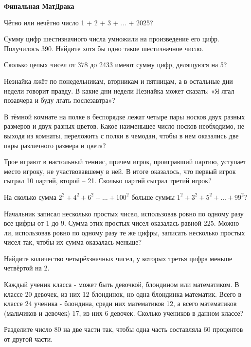 \centerline{\bf \Huge Финальная МатДрака }

 Чётно или нечётно число  1 + 2 + 3 + ... + 2025?


 Сумму цифр шестизначного числа умножили на произведение его цифр. Получилось 390. Найдите хотя бы одно такое шестизначное число.

 Сколько целых чисел от 378 до 2433 имеют сумму цифр, делящуюся
на 5?


 Незнайка лжёт по понедельникам, вторникам и пятницам, а в остальные дни недели говорит правду. В какие дни недели Незнайка может сказать: «Я лгал позавчера и буду лгать послезавтра»?


 В тёмной комнате на полке в беспорядке лежат четыре пары носков двух разных размеров и двух разных цветов. Какое наименьшее число носков необходимо, не выходя из комнаты, переложить с полки в чемодан, чтобы в нем оказались две пары различного размера и цвета?


 Трое играют в настольный теннис, причем игрок, проигравший партию, уступает место игроку, не участвовавшему в ней. В итоге оказалось, что первый игрок сыграл 10 партий, второй – 21. Сколько партий сыграл третий игрок?


 На сколько сумма $2^2+4^2+6^2+\ldots+100^2$ больше суммы $1^2+3^2+5^2+\ldots+99^2 ?$


 Начальник записал несколько простых чисел, использовав ровно по одному
разу все цифры от 1 до 9. Сумма этих простых чисел оказалась равной 225. Можно ли, использовав ровно по одному разу те же цифры, записать несколько простых чисел так, чтобы
их сумма оказалась меньше?


 Найдите количество четырёхзначных чисел, у которых третья цифра
меньше четвёртой на 2.


 Каждый ученик класса - может быть девочкой, блондином или математиком. В классе 20 девочек, из них 12
блондинок, но одна блондинка математик. Всего в классе 24 ученика - блондина, среди них математиков 12, а всего
математиков (мальчиков и девочек) 17, из них 6 девочек. Сколько учеников в данном классе?


Разделите число 80 на две части так, чтобы одна часть составляла 60 процентов от другой части.



\newpage
\hspace{6mm}

